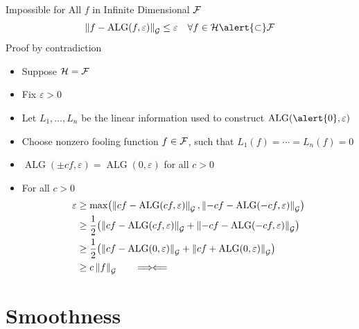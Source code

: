\documentclass[10pt,compress,xcolor={usenames,dvipsnames},aspectratio=169]{beamer}
\newcommand{\contradiction}{%
  \ensuremath{{\Longrightarrow\mspace{-2mu}\Longleftarrow}}%
}
\DeclareMathOperator{\alg}{ALG}
\begin{document}
\begin{frame}{Impossible for All $f$ in Infinite Dimensional $\mathcal{F}$}
\vspace{-5ex}
\[
\norm[\cg]{f - \alg(f,\varepsilon)} \le \varepsilon \quad \forall f \in \ch \alert{\subset} \cf
\]
\alert{Proof by contradiction}

\vspace{-3ex}
\begin{itemize}
    \item Suppose $\mathcal{H} = \mathcal{F}$
    
    \item Fix $\varepsilon > 0$
    
    \item Let $L_1, \ldots, L_n$ be the linear information used to construct $\alg(\alert{0},\varepsilon)$
    
    \item Choose \alert{nonzero fooling function} $f \in \mathcal{F}$, such that $L_1(f) = \cdots = L_n(f) = 0$
    
    \item $\alg(\pm cf,\varepsilon) = \alg(0,\varepsilon)$ for all $c > 0$
    
    \item For all $c > 0$
    \begin{align*}
        \varepsilon & \ge \max\bigl(\norm[\cg]{cf - \alg(cf,\varepsilon)}, \norm[\cg]{-cf - \alg(-cf,\varepsilon)} \bigr) \\
        & \ge \frac 12 \bigl(\norm[\cg]{cf - \alg(cf,\varepsilon)} + \norm[\cg]{-cf - \alg(-cf,\varepsilon)} \bigr) \\
        & \ge \frac 12 \bigl(\norm[\cg]{cf - \alg(0,\varepsilon)} + \norm[\cg]{cf + \alg(0,\varepsilon)} \bigr) \\
        & \ge  c \norm[\cg]{f} \qquad \contradiction
    \end{align*}
    
\end{itemize}

\end{frame}

\section{Smoothness}
\end{document}
